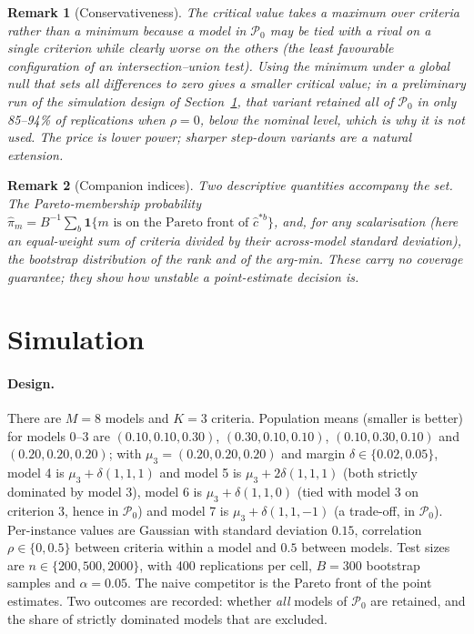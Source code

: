 \documentclass[11pt,a4paper]{article}
\newtheorem{remark}{Remark}
\begin{document}
\begin{remark}[Conservativeness]
The critical value takes a maximum over criteria rather than a minimum because a model in $\mathcal{P}_0$ may be tied with a rival on a single criterion while clearly worse on the others (the least favourable configuration of an intersection--union test). Using the minimum under a global null that sets all differences to zero gives a smaller critical value; in a preliminary run of the simulation design of Section~\ref{sec:sim}, that variant retained all of $\mathcal{P}_0$ in only 85--94\% of replications when $\rho=0$, below the nominal level, which is why it is not used. The price is lower power; sharper step-down variants \citep{romano2005} are a natural extension.
\end{remark}

\begin{remark}[Companion indices]
Two descriptive quantities accompany the set. The Pareto-membership probability $\hat\pi_m=B^{-1}\sum_b \mathbf{1}\{m \text{ is on the Pareto front of } \hat c^{*b}\}$, and, for any scalarisation (here an equal-weight sum of criteria divided by their across-model standard deviation), the bootstrap distribution of the rank and of the arg-min. These carry no coverage guarantee; they show how unstable a point-estimate decision is.
\end{remark}

\section{Simulation}\label{sec:sim}
\paragraph{Design.} There are $M=8$ models and $K=3$ criteria. Population means (smaller is better) for models 0--3 are $(0.10,0.10,0.30)$, $(0.30,0.10,0.10)$, $(0.10,0.30,0.10)$ and $(0.20,0.20,0.20)$; with $\mu_3=(0.20,0.20,0.20)$ and margin $\delta\in\{0.02,0.05\}$, model 4 is $\mu_3+\delta(1,1,1)$ and model 5 is $\mu_3+2\delta(1,1,1)$ (both strictly dominated by model 3), model 6 is $\mu_3+\delta(1,1,0)$ (tied with model 3 on criterion 3, hence in $\mathcal{P}_0$) and model 7 is $\mu_3+\delta(1,1,-1)$ (a trade-off, in $\mathcal{P}_0$). Per-instance values are Gaussian with standard deviation $0.15$, correlation $\rho\in\{0,0.5\}$ between criteria within a model and $0.5$ between models. Test sizes are $n\in\{200,500,2000\}$, with 400 replications per cell, $B=300$ bootstrap samples and $\alpha=0.05$. The naive competitor is the Pareto front of the point estimates. Two outcomes are recorded: whether \emph{all} models of $\mathcal{P}_0$ are retained, and the share of strictly dominated models that are excluded.
\end{document}
